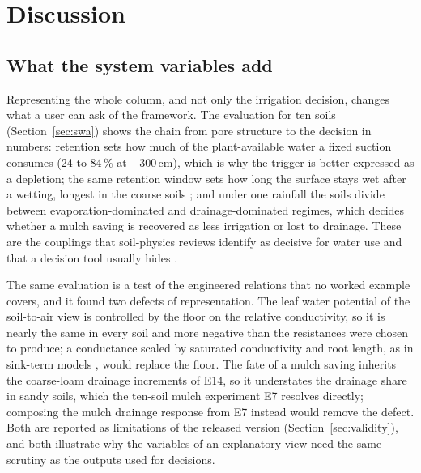 \section{Discussion}
\label{sec:disc}
\subsection{What the system variables add}
\label{sec:disc-swa}
Representing the whole column, and not only the irrigation decision, changes what a user can ask of the framework. The evaluation for ten soils (Section~\ref{sec:swa}) shows the chain from pore structure to the decision in numbers: retention sets how much of the plant-available water a fixed suction consumes (24 to 84\,\% at $-300$\,cm), which is why the trigger is better expressed as a depletion; the same retention window sets how long the surface stays wet after a wetting, longest in the coarse soils \citep{Lehmann2008}; and under one rainfall the soils divide between evaporation-dominated and drainage-dominated regimes, which decides whether a mulch saving is recovered as less irrigation or lost to drainage. These are the couplings that soil-physics reviews identify as decisive for water use and that a decision tool usually hides \citep{Or2013,Vereecken2016}.

The same evaluation is a test of the engineered relations that no worked example covers, and it found two defects of representation. The leaf water potential of the soil-to-air view is controlled by the floor on the relative conductivity, so it is nearly the same in every soil and more negative than the resistances were chosen to produce; a conductance scaled by saturated conductivity and root length, as in sink-term models \citep{Feddes1978}, would replace the floor. The fate of a mulch saving inherits the coarse-loam drainage increments of E14, so it understates the drainage share in sandy soils, which the ten-soil mulch experiment E7 resolves directly; composing the mulch drainage response from E7 instead would remove the defect. Both are reported as limitations of the released version (Section~\ref{sec:validity}), and both illustrate why the variables of an explanatory view need the same scrutiny as the outputs used for decisions.

